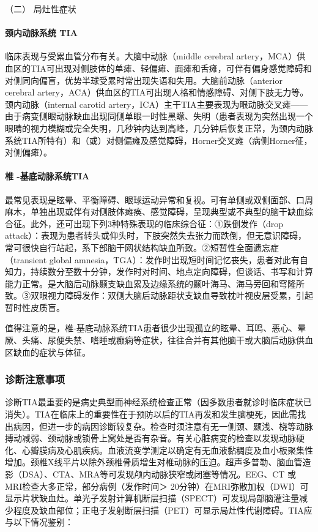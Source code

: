 \hypertarget{text00241.htmlux5cux23CHP8-1-1-2-1-2}{}
（二） 局灶性症状

\paragraph{颈内动脉系统 TIA}

临床表现与受累血管分布有关。大脑中动脉（middle cerebral
artery，MCA）供血区的TIA可出现对侧肢体的单瘫、轻偏瘫、面瘫和舌瘫，可伴有偏身感觉障碍和对侧同向偏盲，优势半球受累时常出现失语和失用。大脑前动脉（anterior
cerebral
artery，ACA）供血区的TIA可出现人格和情感障碍、对侧下肢无力等。颈内动脉（internal
carotid
artery，ICA）主干TIA主要表现为眼动脉交叉瘫------由于病变侧眼动脉缺血出现同侧单眼一时性黑矇、失明（患者表现为突然出现一个眼睛的视力模糊或完全失明，几秒钟内达到高峰，几分钟后恢复正常，为颈内动脉系统TIA所特有）和（或）对侧偏瘫及感觉障碍，Horner交叉瘫（病侧Horner征，对侧偏瘫）。

\paragraph{椎 -基底动脉系统TIA}

最常见表现是眩晕、平衡障碍、眼球运动异常和复视。可有单侧或双侧面部、口周麻木，单独出现或伴有对侧肢体瘫痪、感觉障碍，呈现典型或不典型的脑干缺血综合征。此外，还可出现下列3种特殊表现的临床综合征：①跌倒发作（drop
attack）：表现为患者转头或仰头时，下肢突然失去张力而跌倒，但无意识障碍，常可很快自行站起，系下部脑干网状结构缺血所致。②短暂性全面遗忘症（transient
global
amnesia，TGA）：发作时出现短时间记忆丧失，患者对此有自知力，持续数分至数十分钟，发作时对时间、地点定向障碍，但谈话、书写和计算能力正常。是大脑后动脉颞支缺血累及边缘系统的颞叶海马、海马旁回和穹隆所致。③双眼视力障碍发作：双侧大脑后动脉距状支缺血导致枕叶视皮层受累，引起暂时性皮质盲。

值得注意的是，椎-基底动脉系统TIA患者很少出现孤立的眩晕、耳鸣、恶心、晕厥、头痛、尿便失禁、嗜睡或癫痫等症状，往往合并有其他脑干或大脑后动脉供血区缺血的症状与体征。

\subsubsection{诊断注意事项}

诊断TIA最重要的是病史典型而神经系统检查正常（因多数患者就诊时临床症状已消失）。TIA在临床上的重要性在于预防以后的TIA再发和发生脑梗死，因此需找出病因，但进一步的病因诊断较复杂。检查时须注意有无一侧颈、颞浅、桡等动脉搏动减弱、颈动脉或锁骨上窝处是否有杂音。有关心脏病变的检查以发现动脉硬化、心瓣膜病及心肌疾病。血液流变学测定以确定有无血液黏稠度及血小板聚集性增加。颈椎X线平片以除外颈椎骨质增生对椎动脉的压迫。超声多普勒、脑血管造影（DSA）、CTA、MRA等可发现颅内动脉狭窄或闭塞等情况。EEG、CT
或MRI检查大多正常，部分病例（发作时间＞
20分钟）在MRI弥散加权（DWI）可显示片状缺血灶。单光子发射计算机断层扫描（SPECT）可发现局部脑灌注量减少程度及缺血部位；正电子发射断层扫描（PET）可显示局灶性代谢障碍。TIA应与以下情况鉴别：

